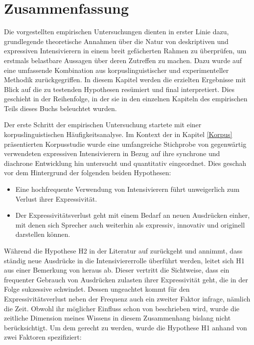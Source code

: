 
\chapter{{Zusammenfassung}} \label{Abschlussdiskussion}
Die vorgestellten empirischen Untersuchungen dienten in erster Linie dazu, grundlegende theoretische Annahmen über die Natur von deskriptiven und expressiven Intensivierern in einem breit gefächerten Rahmen zu überprüfen, um erstmals belastbare Aussagen über deren Zutreffen zu machen. Dazu wurde auf eine umfassende Kombination aus korpuslinguistischer und experimenteller Methodik zurückgegriffen. In diesem Kapitel werden die erzielten Ergebnisse mit Blick auf die zu testenden Hypothesen resümiert und final interpretiert. Dies geschieht in der Reihenfolge, in der sie in den einzelnen Kapiteln des empirischen Teils dieses Buchs beleuchtet wurden. 

Der erste Schritt der empirischen Untersuchung startete mit einer korpuslinguistischen Häufigkeitsanalyse. Im Kontext der in Kapitel \ref{Korpus} präsentierten Korpusstudie wurde eine umfangreiche Stichprobe von gegenwärtig verwendeten expressiven Intensivierern in Bezug auf ihre synchrone und diachrone Entwicklung hin untersucht und quantitativ eingeordnet. Dies geschah vor dem Hintergrund der folgenden beiden Hypothesen:

\begin{itemize}
\item[\textbf{\textsc{H1}}] Eine hochfrequente Verwendung von Intensivierern führt unweigerlich zum Verlust ihrer Expressivität.

\item[\textbf{\textsc{H2}}] Der Expressivitätsverlust geht mit einem Bedarf an neuen Ausdrücken einher, mit denen sich Sprecher auch weiterhin als expressiv, innovativ und originell darstellen können.
\end{itemize}

\noindent Während die Hypothese H2 in der Literatur auf \citet[274]{Baumgarten.1908} zurückgeht und annimmt, dass ständig neue Ausdrücke in die Intensiviererrolle überführt werden, leitet sich H1 aus einer Bemerkung von \citet[2]{Hauschild.1899} heraus ab. Dieser vertritt die Sichtweise, dass ein frequenter Gebrauch von Ausdrücken zulasten ihrer Expressivität geht, die in der Folge sukzessive schwindet. Dessen ungeachtet kommt für den Expressivitätsverlust neben der Frequenz auch ein zweiter Faktor infrage, nämlich die Zeit. Obwohl ihr möglicher Einfluss schon von \citet[59]{Tobler.1868} beschrieben wird, wurde die zeitliche Dimension meines Wissens in diesem Zusammenhang bislang nicht berücksichtigt. Um dem gerecht zu werden, wurde die Hypothese H1 anhand von zwei Faktoren spezifiziert:

